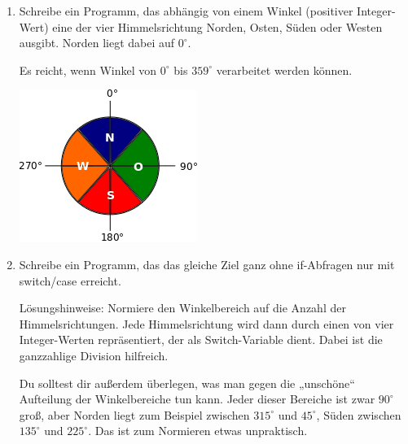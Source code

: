 \documentclass[final,a4paper]{article}
\begin{document}
\begin{enumerate}
{}

\item{
Schreibe ein Programm, das abhängig von einem Winkel (positiver Integer-Wert) eine der vier Himmelsrichtung Norden, Osten, Süden oder Westen ausgibt. Norden liegt dabei auf \(0^\circ\). 

Es reicht, wenn Winkel von \(0^\circ\) bis \(359^\circ\) verarbeitet werden können.
}

\includegraphics{aufgabe_2_7_kompass.png}

\item{
Schreibe ein Programm, das das gleiche Ziel ganz ohne if-Abfragen nur mit switch/case erreicht.

Lösungshinweise: Normiere den Winkelbereich auf die Anzahl der Himmelsrichtungen. Jede Himmelsrichtung wird dann durch einen von vier Integer-Werten repräsentiert, der als Switch-Variable dient. Dabei ist die ganzzahlige Division hilfreich.

Du solltest dir außerdem überlegen, was man gegen die „unschöne“ Aufteilung der Winkelbereiche tun kann. Jeder dieser Bereiche ist zwar \(90^\circ\) groß, aber Norden liegt zum Beispiel zwischen \(315^\circ\) und \(45^\circ\), Süden zwischen \(135^\circ\) und \(225^\circ\). Das ist zum Normieren etwas unpraktisch.
}
\end{enumerate}
\end{document}
